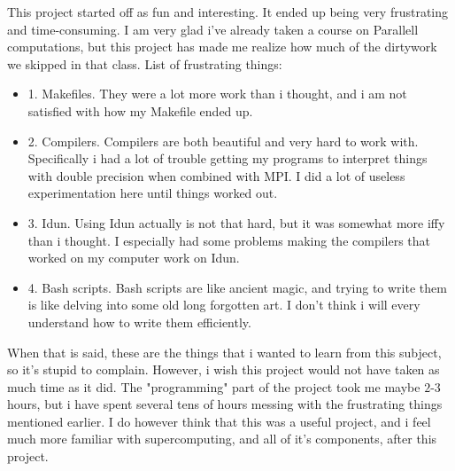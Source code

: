 \documentclass[12pt]{article}
\begin{document}
This project started off as fun and interesting. It ended up being very frustrating and time-consuming. I am very glad i've already taken a course on Parallell computations,
but this project has made me realize how much of the dirtywork we skipped in that class. List of frustrating things:
\begin{itemize}
    \item 1. Makefiles. They were a lot more work than i thought, and i am not satisfied with how my Makefile ended up.
    \item 2. Compilers. Compilers are both beautiful and very hard to work with. Specifically i had a lot of trouble getting my programs
        to interpret things with double precision when combined with MPI. I did a lot of useless experimentation here until things worked out.
    \item 3. Idun. Using Idun actually is not that hard, but it was somewhat more iffy than i thought. I especially had some problems making the compilers that worked
        on my computer work on Idun.
    \item 4. Bash scripts. Bash scripts are like ancient magic, and trying to write them is like delving into some old long forgotten art.
        I don't think i will every understand how to write them efficiently.
\end{itemize}
When that is said, these are the things that i wanted to learn from this subject, so it's stupid to complain. However, i wish this project would not have taken as much time as it did.
The "programming" part of the project took me maybe $2$-$3$ hours, but i have spent several tens of hours messing with the frustrating things mentioned earlier. I do however think 
that this was a useful project, and i feel much more familiar with supercomputing, and all of it's components, after this project.
\end{document}
